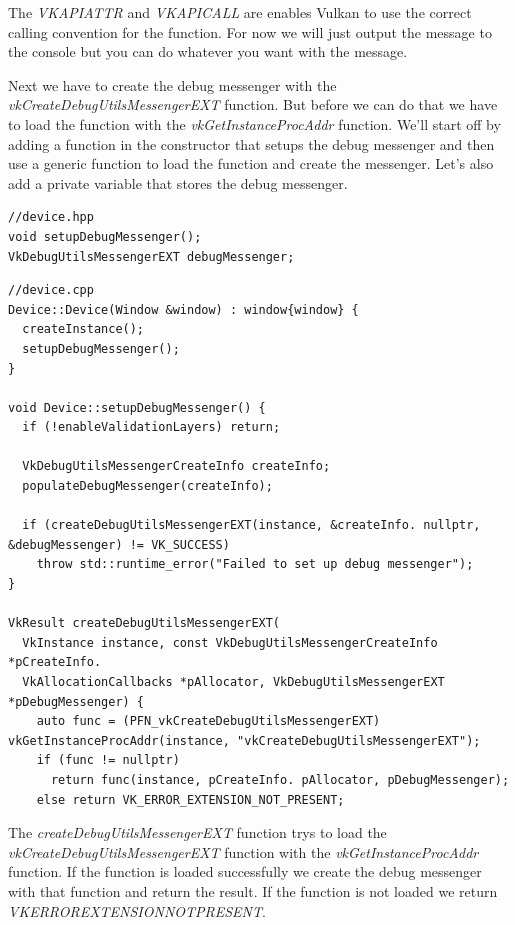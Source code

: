 \documentclass[12pt]{report} \usepackage{preamble}
\begin{document}
The \textit{VKAPI\textunderscore ATTR} and \textit{VKAPI\textunderscore CALL} are enables Vulkan to
use the correct calling convention for the function. For now we will just output the message to the
console but you can do whatever you want with the message.

Next we have to create the debug messenger with the \textit{vkCreateDebugUtilsMessengerEXT} function.
But before we can do that we have to load the function with the \textit{vkGetInstanceProcAddr} function.
We'll start off by adding a function in the constructor that setups the debug messenger and then
use a generic function to load the function and create the messenger. Let's also add a private
variable that stores the debug messenger.

\newpage

\begin{lstlisting}[Language=C++]
//device.hpp
void setupDebugMessenger();
VkDebugUtilsMessengerEXT debugMessenger;
\end{lstlisting}

\begin{lstlisting}[Language=C++]
//device.cpp
Device::Device(Window &window) : window{window} {
  createInstance();
  setupDebugMessenger();
}

void Device::setupDebugMessenger() {
  if (!enableValidationLayers) return;

  VkDebugUtilsMessengerCreateInfo createInfo;
  populateDebugMessenger(createInfo);

  if (createDebugUtilsMessengerEXT(instance, &createInfo. nullptr, &debugMessenger) != VK_SUCCESS)
    throw std::runtime_error("Failed to set up debug messenger");
}

VkResult createDebugUtilsMessengerEXT(
  VkInstance instance, const VkDebugUtilsMessengerCreateInfo *pCreateInfo.
  VkAllocationCallbacks *pAllocator, VkDebugUtilsMessengerEXT *pDebugMessenger) {
    auto func = (PFN_vkCreateDebugUtilsMessengerEXT) vkGetInstanceProcAddr(instance, "vkCreateDebugUtilsMessengerEXT");
    if (func != nullptr) 
      return func(instance, pCreateInfo. pAllocator, pDebugMessenger);
    else return VK_ERROR_EXTENSION_NOT_PRESENT;
\end{lstlisting}

The \textit{createDebugUtilsMessengerEXT} function trys to load the \textit{vkCreateDebugUtilsMessengerEXT}
function with the \textit{vkGetInstanceProcAddr} function. If the function is loaded successfully
we create the debug messenger with that function and return the result. If the function is not loaded
we return \textit{VK\textunderscore ERROR\textunderscore EXTENSION\textunderscore NOT\textunderscore PRESENT}.
\end{document}
